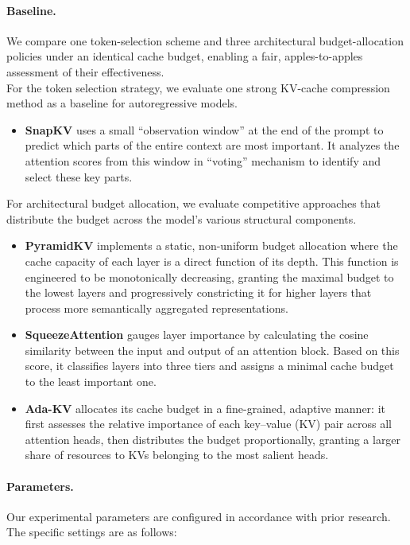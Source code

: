 \paragraph{Baseline.}
We compare one token-selection scheme and three architectural budget-allocation policies under an identical cache budget, enabling a fair, apples-to-apples assessment of their effectiveness. \\
For the token selection strategy, we evaluate one strong KV-cache compression method as a baseline for autoregressive models.
\begin{itemize}
  \item \textbf{SnapKV} uses a small ``observation window'' at the end of the prompt to predict which parts of the entire context are most important. It analyzes the attention scores from this window in ``voting'' mechanism to identify and select these key parts.
\end{itemize}
For architectural budget allocation, we evaluate competitive approaches that distribute the budget across the model's various structural components.
\begin{itemize}
  \item \textbf{PyramidKV} implements a static, non-uniform budget allocation where the cache capacity of each layer is a direct function of its depth. This function is engineered to be monotonically decreasing, granting the maximal budget to the lowest layers and progressively constricting it for higher layers that process more semantically aggregated representations.
  \item \textbf{SqueezeAttention} gauges layer importance by calculating the cosine similarity between the input and output of an attention block. Based on this score, it classifies layers into three tiers and assigns a minimal cache budget to the least important one.
  \item \textbf{Ada-KV} allocates its cache budget in a fine-grained, adaptive manner: it first assesses the relative importance of each key–value (KV) pair across all attention heads, then distributes the budget proportionally, granting a larger share of resources to KVs belonging to the most salient heads.
\end{itemize}


\paragraph{Parameters.}
Our experimental parameters are configured in accordance with prior research\citep{li2024snapkv, cai2024pyramidkv,wang2024squeezeattention, feng2024ada}. The specific settings are as follows:

